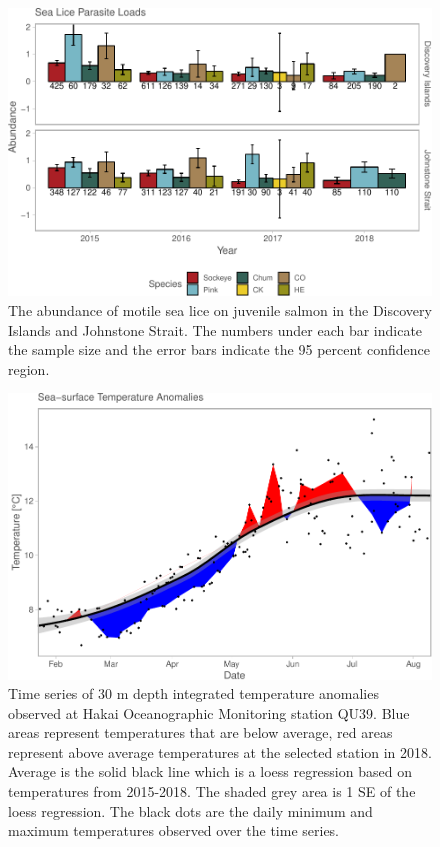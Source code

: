 \documentclass[fleqn,10pt]{wlpeerj} %
\begin{document}
\begin{figure}[H]
\includegraphics[width=0.9\linewidth]{Migration_Observations_Report_files/figure-latex/sealice-1} \caption{The abundance of motile sea lice on juvenile salmon in the Discovery Islands and Johnstone Strait. The numbers under each bar indicate the sample size and the error bars indicate the 95 percent confidence region.}\label{fig:sealice}
\end{figure}

\begin{figure}[H]
\includegraphics[width=0.9\linewidth]{Migration_Observations_Report_files/figure-latex/sst-1} \caption{Time series of 30 m depth integrated temperature anomalies observed at Hakai Oceanographic Monitoring station QU39. Blue areas represent temperatures that are below average, red areas represent above average temperatures at the selected station in 2018. Average is the solid black line which is a loess regression based on temperatures from 2015-2018. The shaded grey area is 1 SE of the loess regression. The black dots are the daily minimum and maximum temperatures observed over the time series.}\label{fig:sst}
\end{figure}
\end{document}

